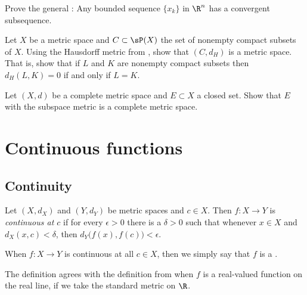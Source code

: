 \documentclass[12pt]{book}
\begin{document}
\begin{exercise}
Prove the general :
Any bounded sequence $\{ x_k
\}$ in $\R^n$ has a convergent subsequence.
\end{exercise}

\begin{exercise}
Let $X$ be a metric space and
$C \subset \sP(X)$ the set of nonempty compact subsets of $X$.
Using the Hausdorff metric from ,
show that $(C,d_H)$ is a metric space.
That is, show that
if $L$ and $K$ are nonempty compact subsets then $d_H(L,K) = 0$
if and only if $L=K$.
\end{exercise}

\begin{exercise} \label{exercise:closedcomplete}
Let $(X,d)$ be a complete metric space and $E \subset X$ a closed set.
Show that $E$ with the subspace metric is a complete metric space.
\end{exercise}


\sectionnewpage
\section{Continuous functions}
\label{sec:metcont}


\subsection*{Continuity}

\begin{defn}
Let $(X,d_X)$ and $(Y,d_Y)$ be metric spaces and $c \in X$.
Then $f \colon X \to Y$ is
\emph{continuous at $c$}
if for every $\epsilon > 0$
there is a $\delta > 0$ such that whenever $x \in X$ and $d_X(x,c) <
\delta$, then
$d_Y\bigl(f(x),f(c)\bigr) < \epsilon$.

\medskip

When $f \colon X \to Y$ is continuous at all $c \in X$, then we simply say
that $f$ is a \emph{}.
\end{defn}

The definition agrees with the definition from  when
$f$ is a real-valued function on the real line, if we take the standard
metric on $\R$.
\end{document}
